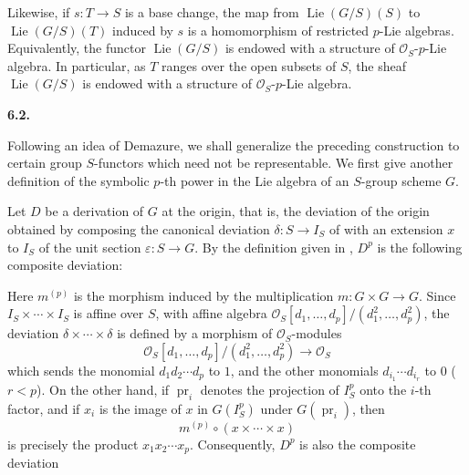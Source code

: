 Likewise, if \(s:T\to S\) is a base change, the map from
\(\operatorname{Lie}(G/S)(S)\) to
\(\operatorname{Lie}(G/S)(T)\) induced by \(s\) is a
homomorphism of restricted \(p\)-Lie algebras. Equivalently, the
functor \(\operatorname{Lie}(G/S)\) is endowed with a structure
of \(\mathcal O_S\)-\(p\)-Lie algebra. In particular, as \(T\)
ranges over the open subsets of \(S\), the sheaf
\(\operatorname{Lie}(G/S)\) is endowed with a structure of
\(\mathcal O_S\)-\(p\)-Lie algebra.

\medskip
\noindent\textbf{6.2.}
\label{sga3:VIIA:6.2}

Following an idea of Demazure, we shall generalize the preceding
construction to certain group \(S\)-functors which need not be
representable. We first give another definition of the symbolic
\(p\)-th power in the Lie algebra of an \(S\)-group scheme \(G\).

Let \(D\) be a derivation of \(G\) at the origin, that is, the
deviation of the origin obtained by composing the canonical deviation
\(\delta:S\to I_S\) of  with an extension \(x\) to \(I_S\) of the
unit section \(\varepsilon:S\to G\). By the definition given in ,
\(D^p\) is the following composite deviation:
\begin{center}
  \label{sga3:VIIA:6.2-demazure-pfold-composite}
  
\end{center}
Here \(m^{(p)}\) is the morphism induced by the multiplication
\(m:G\times G\to G\). Since \(I_S\times\cdots\times I_S\) is affine
over \(S\), with affine algebra
\(\mathcal O_S[d_1,\ldots,d_p]/(d_1^2,\ldots,d_p^2)\), the deviation
\(\delta\times\cdots\times\delta\) is defined by a morphism of
\(\mathcal O_S\)-modules
\[
  \mathcal O_S[d_1,\ldots,d_p]/(d_1^2,\ldots,d_p^2)
  \longrightarrow\mathcal O_S
\]
which sends the monomial \(d_1d_2\cdots d_p\) to \(1\), and the other
monomials \(d_{i_1}\cdots d_{i_r}\) to \(0\) (\(r<p\)). On the other
hand, if \(\operatorname{pr}_i\) denotes the projection of \(I_S^p\)
onto the \(i\)-th factor, and if \(x_i\) is the image of \(x\) in
\(G(I_S^p)\) under \(G(\operatorname{pr}_i)\), then
\[
  m^{(p)}\circ(x\times\cdots\times x)
\]
is precisely the product \(x_1x_2\cdots x_p\). Consequently,
\(D^p\) is also the composite deviation
\begin{center}
  \label{sga3:VIIA:6.2-demazure-product-composite}
  
\end{center}

